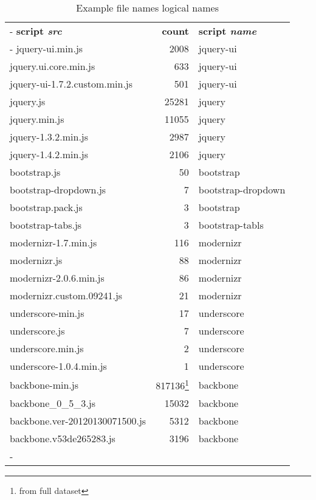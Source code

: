 \begin{table}
	\begin{tabu} to 0.9
		\tabucline-
		\rowfont{\normalfont\bfseries}
		\textbf{script \emph{src}} & \textbf{count} & \textbf{script \emph{name}} \\
		\tabucline-
		jquery-ui.min.js				&	2008	&	jquery-ui \\
		jquery.ui.core.min.js   		&	633		&	jquery-ui \\
		jquery-ui-1.7.2.custom.min.js	&	501		&	jquery-ui \\
		jquery.js	   					&	25281	&	jquery \\
		jquery.min.js   				&	11055	&	jquery \\
		jquery-1.3.2.min.js	 			&	2987	&	jquery \\
		jquery-1.4.2.min.js	 			&	2106	&	jquery \\
		bootstrap.js					&	50 		&	bootstrap \\
		bootstrap-dropdown.js			&	7		&	bootstrap-dropdown \\
		bootstrap.pack.js				&	3		&	bootstrap \\
		bootstrap-tabs.js				&	3		&	bootstrap-tabls \\
		modernizr-1.7.min.js			&	116		&	modernizr \\
		modernizr.js					&	88		&	modernizr \\
		modernizr-2.0.6.min.js			&	86		&	modernizr \\
		modernizr.custom.09241.js   	&	21 		&	modernizr \\
		underscore-min.js				& 	17		&	underscore \\
		underscore.js					& 	7		&	underscore \\
		underscore.min.js				& 	2 		&	underscore \\
		underscore-1.0.4.min.js 		&	1 		&	underscore \\
		backbone-min.js					&	817136\footnote{\label{tab:note_full}from full dataset}	&	backbone \\
		backbone\_0\_5\_3.js			&	15032	&	backbone \\
		backbone.ver-20120130071500.js	&	5312	&	backbone \\
		backbone.v53de265283.js			&	3196	&	backbone \\
		\tabucline-
	\end{tabu}
	\caption{Example file names logical names\label{tab:example_names}}
\end{table}

